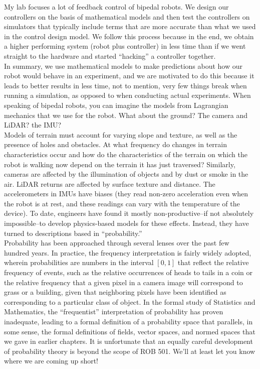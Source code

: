My lab focuses a lot of feedback control of bipedal robots. We design our controllers on the basis of mathematical models and then test the controllers on simulators that typically include terms that are more accurate than what we used in the control design model. We follow this process because in the end, we obtain a higher performing system (robot plus controller) in less time than if we went straight to the hardware and started ``hacking'' a controller together. \\

In summary, we use mathematical models to make predictions about how our robot would behave in an experiment, and we are motivated to do this because it leads to better results in less time, not to mention, very few things break when running a simulation, as opposed to when conducting actual experiments. 
When speaking of bipedal robots, you can imagine the models from Lagrangian mechanics that we use for the robot. What about the ground? The camera and LiDAR? the IMU?\\

Models of terrain must account for varying slope and texture, as well as the presence of holes and obstacles. At what frequency do changes in terrain characteristics occur and how do the characteristics of the terrain on which the robot is walking now depend on the terrain it has just traversed? Similarly, cameras are affected by the illumination of objects and by dust or smoke in the air. LiDAR returns are affected by surface texture and distance. The accelerometers in IMUs have biases (they read non-zero acceleration even when the robot is at rest, and these readings can vary with the temperature of the device). To date, engineers have found it mostly non-productive--if not absolutely impossible--to develop physics-based models for these effects. Instead, they have turned to descriptions based in ``probability.'' \\

Probability has been approached through several lenses over the past few hundred years. In practice, the frequency interpretation is fairly widely adopted, wherein probabilities are numbers in the interval $[0, 1]$ that reflect the relative frequency of events, such as the relative occurrences of heads to tails in a coin or the relative frequency that a given pixel in a camera image will correspond to grass or a building, given that neighboring pixels have been identified as corresponding to a particular class of object. In the formal study of Statistics and Mathematics, the ``frequentist'' interpretation of probability has proven inadequate, leading to a formal definition of a probability space that parallels, in some sense, the formal definitions of fields, vector spaces, and normed spaces that we gave in earlier chapters. It is unfortunate that an equally careful development of probability theory is beyond the scope of ROB 501. We'll at least let you know where we are coming up short!  

